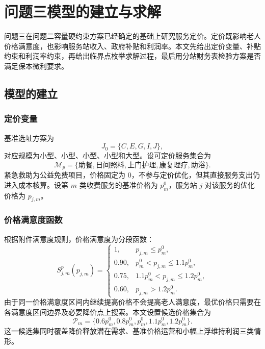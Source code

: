 \section{问题三模型的建立与求解}

问题三在问题二容量硬约束方案已经确定的基础上研究服务定价。定价既影响老人价格满意度，也影响服务站收入、政府补贴和利润率。本文先给出定价变量、补贴约束和利润率约束，再给出临界点枚举求解过程，最后用分站财务表检验方案是否满足保本微利要求。

\subsection{模型的建立}

\subsubsection{定价变量}

基准选址方案为
\begin{equation}
J_0=\{C,E,G,I,J\},
\end{equation}
对应规模为小型、小型、小型、小型和大型。设可定价服务集合为
\begin{equation}
\mathcal{M}_p=\{\text{助餐},\text{日间照料},\text{上门护理},\text{康复理疗},\text{助浴}\}.
\end{equation}
紧急救助为公益免费项目，价格固定为 0，不参与定价优化，但其直接服务支出仍进入成本核算。设第 $m$ 类收费服务的基准价格为 $p_m^0$，服务站 $j$ 对该服务的优化价格为 $p_{j,m}$。

\subsubsection{价格满意度函数}

根据附件满意度规则，价格满意度为分段函数：
\begin{equation}
S_{j,m}^p(p_{j,m})=
\begin{cases}
1, & p_{j,m}\leq p_m^0,\\
0.90, & p_m^0<p_{j,m}\leq 1.1p_m^0,\\
0.75, & 1.1p_m^0<p_{j,m}\leq 1.2p_m^0,\\
0.60, & p_{j,m}>1.2p_m^0.
\end{cases}
\end{equation}
由于同一价格满意度区间内继续提高价格不会提高老人满意度，最优价格只需要在各满意度区间边界及必要降价点上搜索。本文设置候选价格集合为
\begin{equation}
\mathcal{P}_m=\{0.6p_m^0,0.8p_m^0,p_m^0,1.1p_m^0,1.2p_m^0\}.
\end{equation}
这一候选集同时覆盖降价释放潜在需求、基准价格运营和小幅上浮维持利润三类情形。

